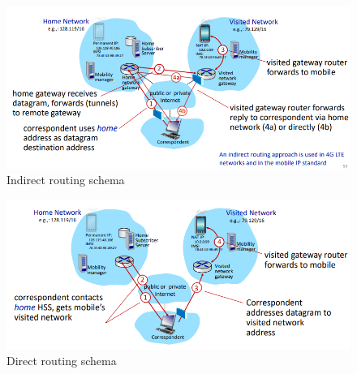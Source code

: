 \documentclass[10pt,a4paper]{report}
\theoremstyle{definition}
\begin{document}
  \begin{figure}[h]

		\centering
		\includegraphics[scale=0.50]{images/Pasted image 20230309180332.png}
		\caption{Indirect routing schema}
		\label{indirect-routing-schema}
\end{figure}



	\begin{figure}[h]
		\centering
		\includegraphics[scale=0.50]{images/Pasted image 20230309180602.png}
		\caption{Direct routing schema}
		\label{direct-routing-schema}

\end{figure}
\end{document}
